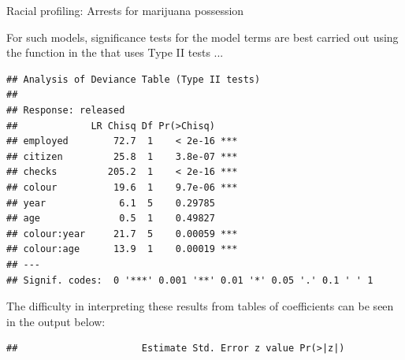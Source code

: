 \documentclass[11pt]{book}
\renewenvironment{knitrout}{\small\renewcommand{\baselinestretch}{.85}}{} %
\begin{document}
\begin{Example}[arrests]{Racial profiling: Arrests for marijuana possession}
\begin{knitrout}
\color{fgcolor}\begin{kframe}
\begin{alltt}
\hlopt{$} \hlkwb{<-} \hlopt{$}
 \hlkwb{<-}  \hlopt{~}  \hlopt{+}  \hlopt{+} 
                   \hlopt{+} \hlopt{*} \hlopt{+} \hlopt{*}
                    
\end{alltt}
\end{kframe}
\end{knitrout}
For such models, significance tests for the model terms are best carried out
using the  function in the  that uses Type II tests ...
\begin{knitrout}
\color{fgcolor}\begin{kframe}
\begin{alltt}
\end{alltt}
\begin{verbatim}
## Analysis of Deviance Table (Type II tests)
## 
## Response: released
##             LR Chisq Df Pr(>Chisq)    
## employed        72.7  1    < 2e-16 ***
## citizen         25.8  1    3.8e-07 ***
## checks         205.2  1    < 2e-16 ***
## colour          19.6  1    9.7e-06 ***
## year             6.1  5    0.29785    
## age              0.5  1    0.49827    
## colour:year     21.7  5    0.00059 ***
## colour:age      13.9  1    0.00019 ***
## ---
## Signif. codes:  0 '***' 0.001 '**' 0.01 '*' 0.05 '.' 0.1 ' ' 1
\end{verbatim}
\end{kframe}
\end{knitrout}
The difficulty in interpreting these results from tables of coefficients can be seen
in the output below:
\begin{knitrout}\footnotesize
{}\color{fgcolor}\begin{kframe}
\begin{alltt}
\end{alltt}
\begin{verbatim}
##                      Estimate Std. Error z value Pr(>|z|)    

\end{verbatim}
\end{kframe}
\end{knitrout}
\end{Example}
\end{document}
